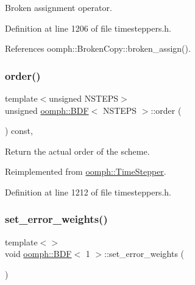 Broken assignment operator. 



Definition at line 1206 of file timesteppers.\+h.



References oomph\+::\+Broken\+Copy\+::broken\+\_\+assign().

\mbox{\label{classoomph_1_1BDF_a778cd01f9e0e8047d5838f6283512131}} 
\subsubsection{\texorpdfstring{order()}{order()}}
{\footnotesize\ttfamily template$<$unsigned N\+S\+T\+E\+PS$>$ \\
unsigned \hyperlink{classoomph_1_1BDF}{oomph\+::\+B\+DF}$<$ N\+S\+T\+E\+PS $>$\+::order (\begin{DoxyParamCaption}{ }\end{DoxyParamCaption}) const\hspace{0.3cm}{\ttfamily [inline]}, {\ttfamily [virtual]}}



Return the actual order of the scheme. 



Reimplemented from \hyperlink{classoomph_1_1TimeStepper_a251e5d4b37381e582b7cf4c554e2e724}{oomph\+::\+Time\+Stepper}.



Definition at line 1212 of file timesteppers.\+h.

\mbox{\label{classoomph_1_1BDF_a298a3ba0ce469359190a3d9ceeeb3652}} 
\subsubsection{\texorpdfstring{set\+\_\+error\+\_\+weights()}{set\_error\_weights()}\hspace{0.1cm}{\footnotesize\ttfamily [1/4]}}
{\footnotesize\ttfamily template$<$$>$ \\
void \hyperlink{classoomph_1_1BDF}{oomph\+::\+B\+DF}$<$ 1 $>$\+::set\+\_\+error\+\_\+weights (\begin{DoxyParamCaption}{ }\end{DoxyParamCaption})\hspace{0.3cm}{\ttfamily [virtual]}}



